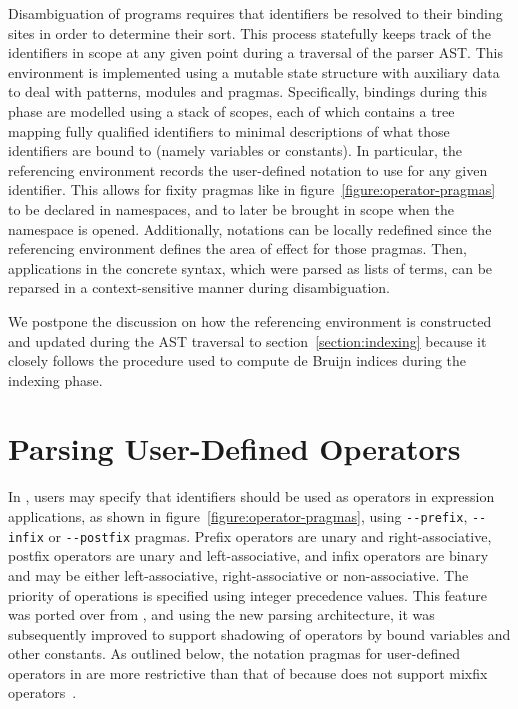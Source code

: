 Disambiguation of \Beluga programs requires that identifiers be resolved to their binding sites in order to determine their sort.
This process statefully keeps track of the identifiers in scope at any given point during a traversal of the parser \ac{AST}.
This environment is implemented using a mutable state structure with auxiliary data to deal with patterns, modules and pragmas.
Specifically, bindings during this phase are modelled using a stack of scopes, each of which contains a tree mapping fully qualified identifiers to minimal descriptions of what those identifiers are bound to (namely variables or constants).
In particular, the referencing environment records the user-defined notation to use for any given identifier.
This allows for fixity pragmas like in figure~\ref{figure:operator-pragmas} to be declared in namespaces, and to later be brought in scope when the namespace is opened.
Additionally, notations can be locally redefined since the referencing environment defines the area of effect for those pragmas.
Then, applications in the concrete syntax, which were parsed as lists of terms, can be reparsed in a context-sensitive manner during disambiguation.

We postpone the discussion on how the referencing environment is constructed and updated during the \ac{AST} traversal to section~\ref{section:indexing} because it closely follows the procedure used to compute de Bruijn indices during the indexing phase.

\section{Parsing User-Defined Operators}\label{section:parsing-user-defined-operators}

In \Beluga, users may specify that identifiers should be used as operators in expression applications, as shown in figure~\ref{figure:operator-pragmas}, using \verb|--prefix|, \verb|--infix| or \verb|--postfix| pragmas.
Prefix operators are unary and right-associative, postfix operators are unary and left-associative, and infix operators are binary and may be either left-associative, right-associative or non-associative.
The priority of operations is specified using integer precedence values.
This feature was ported over from \Twelf, and using the new parsing architecture, it was subsequently improved to support shadowing of operators by bound variables and other constants.
As outlined below, the notation pragmas for user-defined operators in \Beluga are more restrictive than that of \Agda because \Beluga does not support mixfix operators~\cite{danielsson2008parsing}.


